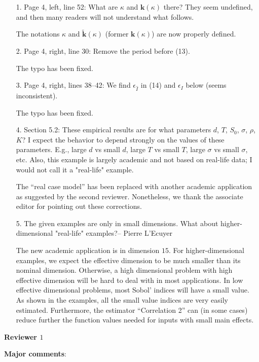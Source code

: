 \documentclass[10pt,a4paper]{article}
\newcommand{\vect}[1]{\boldsymbol{\mathbf{#1}}}
\newcommand{\vk}{\vect{k}}
\begin{document}
\begin{itemize}
\item[1.] Page 4, left, line 52: What are $\kappa$ and $\vk(\kappa)$ there? They seem undefined, and then many readers will not understand what follows.

{\color{blue} The notations $\kappa$ and $\tilde{\vk}(\kappa)$ (former $\vk(\kappa)$) are now properly defined.}
\item[2.] Page 4, right, line 30: Remove the period before (13).

{\color{blue} The typo has been fixed.}
\item[3.] Page 4, right, lines 38--42: We find $\epsilon_{\hat I}$ in (14) and $\epsilon_{I}$ below (seems inconsistent).

{\color{blue} The typo has been fixed.}
\item[4.] Section 5.2: These empirical results are for what parameters $d$, $T$, $S_0$, $\sigma$, $\rho$, $K$? I expect the behavior to depend strongly on the values of these parameters. E.g., large $d$ vs small $d$, large $T$ vs small $T$, large $\sigma$ vs small $\sigma$, etc. Also, this example is largely academic and not based on real-life data; I would not call it a "real-life" example. 

{\color{blue} The ``real case model'' has been replaced with another academic application as suggested by the second reviewer. Nonetheless, we thank the associate editor for pointing out these corrections.}
\item[5.] The given examples are only in small dimensions. What about higher-dimensional "real-life" examples?-- Pierre L'Ecuyer

{\color{blue} The new academic application is in dimension $15$. For higher-dimensional examples, we expect the effective dimension to be much smaller than its nominal dimension. Otherwise, a high dimensional problem with high effective dimension will be hard to deal with in most applications. In low effective dimensional problems, most Sobol' indices will have a small value. As shown in the examples, all the small value indices are very easily estimated. Furthermore, the estimator ``Correlation 2'' can (in some cases) reduce further the function values needed for inputs with small main effects.}
\end{itemize}

\newpage
\textbf{\large{Reviewer $1$}}
\vspace*{0.5cm}

\textbf{Major comments}:
\end{document}
